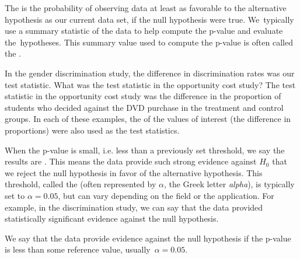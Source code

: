 \begin{termBox}{
The  is the probability of observing data at least as favorable to the alternative hypothesis as our current data set, if the null hypothesis were true. We~typically use a summary statistic of the data to help compute the p-value and evaluate the~hypotheses. This summary value used to compute the p-value is often called the .}
\end{termBox}

\begin{example}{In the gender discrimination study, the difference in discrimination rates was our test statistic. What was the test statistic in the opportunity cost study?}
The test statistic in the opportunity cost study was the difference in the proportion of students who decided against the DVD purchase in the treatment and control groups. In each of these examples, the  of the values of interest (the difference in proportions) were  also used as the test statistics.
\end{example}

When the p-value is small, i.e. less than a previously set threshold, we say the results are . This means the data provide such strong evidence against $H_0$ that we reject the null hypothesis in favor of the alternative hypothesis. This threshold, called the  (often represented by $\alpha$, the Greek letter \emph{alpha}\label{alphadiscussion}), is typically set to $\alpha = 0.05$, but can vary depending on the field or the application. For example, in the discrimination study, we can say that the data provided statistically significant evidence against the null hypothesis.

\begin{termBox}{
We say that the data provide  evidence against the null hypothesis if the p-value is less than some reference value, usually~$\alpha=0.05$.}
\end{termBox}

